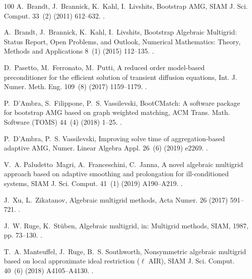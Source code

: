 \documentclass[3p,times]{elsarticle}
\theoremstyle{plain}
\begin{document}
\begin{thebibliography}{100}
A.~Brandt, J.~Brannick, K.~Kahl, I.~Livshits, {Bootstrap AMG}, SIAM J. Sci.
  Comput. 33~(2) (2011) 612--632.
\newblock \href {https://doi.org/10.1137/090752973}
  {}.

A.~Brandt, J.~Brannick, K.~Kahl, I.~Livshits, {Bootstrap Algebraic Multigrid:
  Status Report, Open Problems, and Outlook}, Numerical Mathematics: Theory,
  Methods and Applications 8~(1) (2015) 112--135.
\newblock \href {https://doi.org/10.4208/nmtma.2015.w06si}
  {}.

D.~Pasetto, M.~Ferronato, M.~Putti, A reduced order model-based preconditioner
  for the efficient solution of transient diffusion equations, Int. J. Numer.
  Meth. Eng. 109~(8) (2017) 1159--1179.
\newblock \href {https://doi.org/10.1002/nme.5320}
  {}.

P.~D'Ambra, S.~Filippone, P.~S. Vassilevski, {BootCMatch: A software package
  for bootstrap AMG based on graph weighted matching}, ACM Trans. Math.
  Software (TOMS) 44~(4) (2018) 1--25.
\newblock \href {https://doi.org/10.1145/3190647} {}.

P.~D'Ambra, P.~S. Vassilevski, {Improving solve time of aggregation-based
  adaptive AMG}, Numer. Linear Algebra Appl. 26~(6) (2019) e2269.
\newblock \href {https://doi.org/10.1002/nla.2269}
  {}.

V.~A. Paludetto~Magri, A.~Franceschini, C.~Janna, {A novel algebraic multigrid
  approach based on adaptive smoothing and prolongation for ill-conditioned
  systems}, SIAM J. Sci. Comput. 41~(1) (2019) A190--A219.
\newblock \href {https://doi.org/10.1137/17M1161178}
  {}.

J.~Xu, L.~Zikatanov, {Algebraic multigrid methods}, Acta Numer. 26 (2017)
  591--721.
\newblock \href {https://doi.org/10.1017/S0962492917000083}
  {}.

J.~W. Ruge, K.~St{\"u}ben, {Algebraic multigrid}, in: Multigrid methods, SIAM,
  1987, pp. 73--130.
\newblock \href {https://doi.org/10.1137/1.9781611971057.ch4}
  {}.

T.~A. Manteuffel, J.~Ruge, B.~S. Southworth, {Nonsymmetric algebraic multigrid
  based on local approximate ideal restriction ($\ell$ AIR)}, SIAM J. Sci.
  Comput. 40~(6) (2018) A4105--A4130.
\newblock \href {https://doi.org/10.1137/17M1144350}
  {}.


\end{thebibliography}
\end{document}
